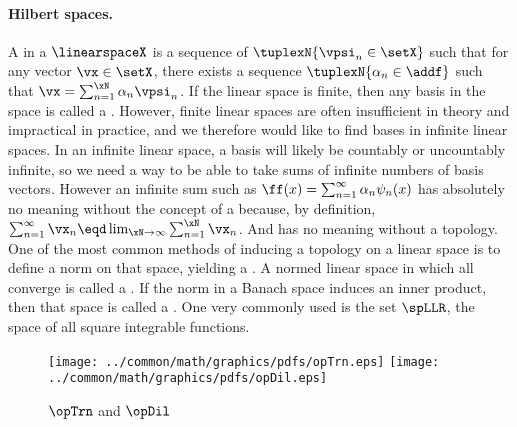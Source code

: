 \paragraph{Hilbert spaces.}
A  in a  $\linearspaceX$ is a 
sequence of  $\tuplexN{\vpsi_n\in\setX}$ 
such that for any vector $\vx\in\setX$, there exists 
a sequence $\tuplexN{\alpha_n\in\addf}$ such that 
$\vx = \sum_{n=1}^\xN \alpha_n\vpsi_n$.
If the linear space is finite, then any basis in the space is called a .
However, finite linear spaces are often insufficient in theory and impractical in practice,
and we therefore would like to find bases in infinite linear spaces. 
In an infinite linear space, a basis will likely be countably or uncountably infinite, so we need a way to 
be able to take sums of infinite numbers of basis vectors.
However an infinite sum such as $\ff(x)=\sum_{n=1}^\infty\alpha_n\psi_n(x)$ has absolutely no meaning 
without the concept of a  because, by definition, 
\quad$\sum_{n=1}^\infty\vx_n \eqd \lim_{\xN\to\infty}\sum_{n=1}^\xN\vx_n$.\quad
And  has no meaning without a topology. %
One of the most common methods of inducing a topology on a linear space is to define a norm on that space, 
yielding a .
A normed linear space in which all  converge is called a .
If the norm in a Banach space induces an inner product, then that space is called a .
One very commonly used  is the set $\spLLR$, 
the space of all square integrable functions. 


\begin{figure}[h]
  \centering%
  \gsize%
  \texttt{[image: ../common/math/graphics/pdfs/opTrn.eps]}\qquad\qquad
  \texttt{[image: ../common/math/graphics/pdfs/opDil.eps]}
  \caption{ $\opTrn$ and  $\opDil$ \label{fig:opTD}}
\end{figure}
